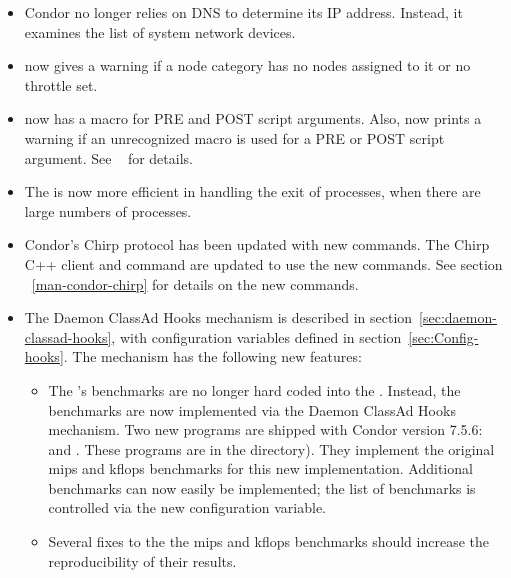\begin{itemize}

\item Condor no longer relies on DNS to determine its IP address.
  Instead, it examines the list of system network devices.

\item {} now gives a warning if a node category has no
nodes assigned to it or no throttle set.

\item {} now has a  macro for PRE and
POST script arguments.
Also,  now prints a warning if an unrecognized macro is
used for a PRE or POST script argument.
See ~\pageref{dagman:SCRIPT} for details.

\item The  is now more efficient in handling the exit of
   processes, when there are large numbers of 
   processes.

\item Condor's Chirp protocol has been updated with new commands.
 The Chirp C++ client
 and  command are updated to use the new commands.
  See section ~\ref{man-condor-chirp} for details on the new commands.

\item The Daemon ClassAd Hooks mechanism is described in
section~\ref{sec:daemon-classad-hooks},
with configuration variables defined in section~\ref{sec:Config-hooks}.
The mechanism has the following new features:
  \begin{itemize}
    \item The 's benchmarks are no longer hard coded into
    the .  Instead, the benchmarks are now implemented
    via the Daemon ClassAd Hooks mechanism.  Two new programs are
    shipped with Condor version 7.5.6:
     and .
    These programs are in  the  directory). 
    They implement the original mips and kflops benchmarks for this 
    new implementation.
    Additional benchmarks can now easily be implemented;
    the list of benchmarks is controlled
    via the new  configuration variable.

  \item Several fixes to the the mips and kflops benchmarks should
    increase the reproducibility of their results.


\end{itemize}
\end{itemize}
